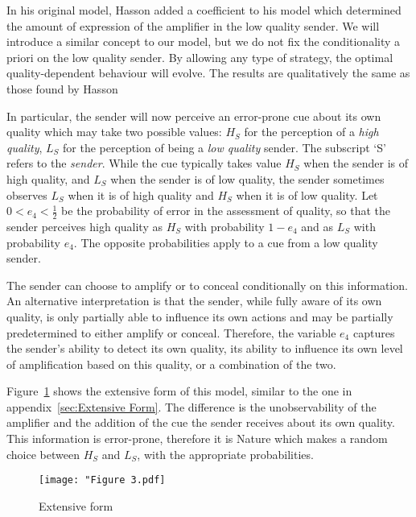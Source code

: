\documentclass[a4paper,12pt]{article}
\numberwithin{equation}{section}
\begin{document}
In his original model, Hasson added a coefficient to his model which determined the amount of expression of the amplifier in the low quality sender. We will introduce a similar concept to our model, but we do not fix the conditionality a priori on the low quality sender. By allowing any type of strategy, the optimal quality-dependent behaviour will evolve. The results are qualitatively the same as those found by Hasson

In particular, the sender will now perceive an error-prone cue about its own quality which may take two possible values: $H_{S}$ for the perception of a \textit{high quality}, $L_{S}$ for the perception of being a \textit{low quality} sender. The subscript `S' refers to the \textit{sender}. While the cue typically takes value $H_{S}$ when the sender is of high quality, and $L_{S}$ when the sender is of low quality, the sender sometimes observes $L_{S}$ when it is of high quality and $H_{S}$ when it is of low quality. Let $0<e_{4}<\frac{1}{2}$ be the probability of error in the assessment of quality, so that the sender perceives high quality as $H_{S}$ with probability $1-e_{4}$ and as $L_{S}$ with probability $e_{4}$. The opposite probabilities apply to a cue from a low quality sender.

The sender can choose to amplify or to conceal conditionally on this information. An alternative interpretation is that the sender, while fully aware of its own quality, is only partially able to influence its own actions and may be partially predetermined to either amplify or conceal. Therefore, the variable $e_{4}$ captures the sender's ability to detect its own quality, its ability to influence its own level of amplification based on this quality, or a combination of the two.

Figure~\ref{fig:Figure 3.pdf} shows the extensive form of this model, similar to the one in appendix~\ref{sec:Extensive Form}. The difference is the unobservability of the amplifier and the addition of the cue the sender receives about its own quality. This information is error-prone, therefore it is Nature which makes a random choice between $H_{S}$ and $L_{S}$, with the appropriate probabilities.

\begin{figure}[h]
\begin{center}
\leavevmode
\texttt{[image: "Figure 3.pdf]}
\caption{Extensive form}
\label{fig:Figure 3.pdf}
\end{center}
\end{figure}
\end{document}
